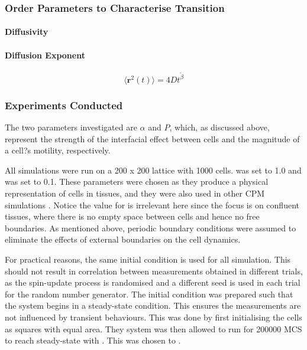 \documentclass[a4paper,12pt]{article}
\begin{document}
\subsubsection{Order Parameters to Characterise Transition}
\paragraph{Diffusivity}


\paragraph{Diffusion Exponent}

\begin{equation}
\langle\bm{r}^2(t)\rangle = 4Dt^{\tilde\beta}
\end{equation}

\subsubsection{Experiments Conducted}
The two parameters investigated are $\alpha$ and $P$, which, as discussed above, represent the strength of the interfacial effect between cells and the magnitude of a cell?s motility, respectively. 

All simulations were run on a 200 x 200 lattice with 1000 cells.  was set to 1.0 and  was set to 0.1. These parameters were chosen as they produce a physical representation of cells in tissues, and they were also used in other CPM simulations \cite{szabo2010}. Notice the value for  is irrelevant here since the focus is on confluent tissues, where there is no empty space between cells and hence no free boundaries. As mentioned above, periodic boundary conditions were assumed to eliminate the effects of external boundaries on the cell dynamics. 

For practical reasons, the same initial condition is used for all simulation. This should not result in correlation between measurements obtained in different trials, as the spin-update process is randomised and a different seed is used in each trial for the random number generator. The initial condition was prepared such that the system begins in a steady-state condition. This ensures the measurements are not influenced by transient behaviours. This was done by first initialising the cells as squares with equal area. They system was then allowed to run for 200000 MCS to reach steady-state with . This was chosen to  .  
\end{document}

